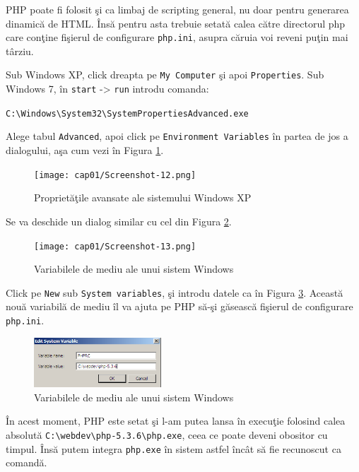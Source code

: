 PHP poate fi folosit şi ca limbaj de scripting general, nu doar pentru
generarea dinamică de HTML. Însă pentru asta trebuie setată calea
către directorul php care conţine fişierul de configurare \texttt{php.ini},
asupra căruia voi reveni puţin mai târziu.

Sub Windows XP, click dreapta pe \texttt{My Computer} şi apoi \texttt{Properties}.
Sub Windows 7, în \texttt{start} -> \texttt{run} introdu comanda:

\texttt{C:{\textbackslash}Windows{\textbackslash}System32{\textbackslash}SystemPropertiesAdvanced.exe}

Alege tabul \texttt{Advanced}, apoi click pe \texttt{Environment Variables} în partea de jos
a dialogului, aşa cum vezi în Figura \ref{fig:win adv props}.
\begin{figure}[ht!]
  \centering
    \texttt{[image: cap01/Screenshot-12.png]}
  \caption{Proprietăţile avansate ale sistemului Windows XP}
  \label{fig:win adv props}
\end{figure}

Se va deschide un dialog similar cu cel din Figura \ref{img:win env vars}.
\begin{figure}[ht!]
  \centering
    \texttt{[image: cap01/Screenshot-13.png]}
  \caption{Variabilele de mediu ale unui sistem Windows}
  \label{img:win env vars}
\end{figure}

Click pe \texttt{New} sub \texttt{System variables}, şi introdu datele ca în
Figura \ref{img:win new env var}. Această nouă variabilă de mediu
îl va ajuta pe PHP să-şi găsească fişierul de configurare \texttt{php.ini}.
\begin{figure}[ht!]
  \centering
    \includegraphics[width=180px]{cap01/Screenshot-14.png}
  \caption{Variabilele de mediu ale unui sistem Windows}
  \label{img:win new env var}
\end{figure}

În acest moment, PHP este setat şi l-am putea lansa în execuţie folosind
calea absolută
\texttt{C:{\textbackslash}webdev{\textbackslash}php-5.3.6{\textbackslash}php.exe}, ceea ce
poate deveni obositor cu timpul. Însă putem integra \texttt{php.exe}
în sistem astfel încât să fie recunoscut ca comandă.

